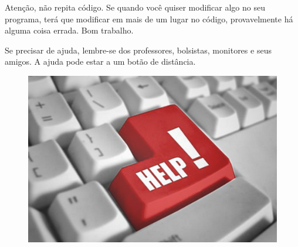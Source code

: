 \documentclass[12pt]{article}
\begin{document}
Atenção, não repita código. Se quando você quiser modificar algo no seu programa, terá que modificar em mais de um lugar no código, provavelmente há alguma coisa errada. Bom trabalho.

Se precisar de ajuda, lembre-se dos professores, bolsistas, monitores e seus amigos. A ajuda pode estar a um botão de distância.

\begin{figure}[h!]
\centering
\includegraphics[width=0.4\linewidth]{./imagens/help}
\end{figure}
\end{document}

